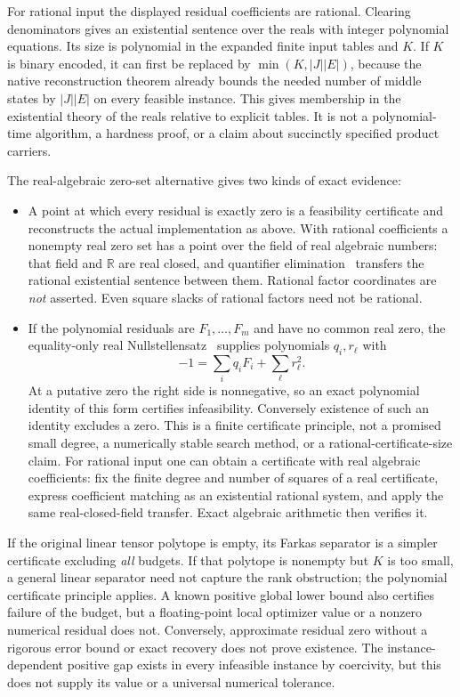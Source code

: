 \documentclass[11pt]{article}
\theoremstyle{remark}
\begin{document}
For rational input the displayed residual coefficients are rational.
Clearing denominators gives an existential sentence over the reals with
integer polynomial equations. Its size is polynomial in the expanded
finite input tables and $K$. If $K$ is binary encoded, it can first be
replaced by $\min(K,|J||E|)$, because the native reconstruction theorem
already bounds the needed number of middle states by $|J||E|$ on every
feasible instance. This gives membership in the existential theory of the
reals relative to explicit tables. It is not a polynomial-time algorithm,
a hardness proof, or a claim about succinctly specified product carriers.

The real-algebraic zero-set alternative gives two kinds of exact evidence:
\begin{itemize}
\item A point at which every residual is exactly zero is a feasibility
certificate and reconstructs the actual implementation as above. With
rational coefficients a nonempty real zero set has a point over the field
of real algebraic numbers: that field and $\mathbb R$ are real closed, and
quantifier elimination~\cite[Section 1.1 and Theorem 2.1]{Basu2014} transfers the rational existential sentence between
them. Rational factor coordinates are \emph{not} asserted. Even square
slacks of rational factors need not be rational.
\item If the polynomial residuals are $F_1,\ldots,F_m$ and have no common
real zero, the equality-only real Nullstellensatz~\cite[Theorem 4.6]{Parrilo2003} supplies polynomials $q_i,r_\ell$ with
\begin{equation}\label{eq:budget-nullstellensatz}
 -1=\sum_iq_iF_i+\sum_\ell r_\ell^2.
\end{equation}
At a putative zero the right side is nonnegative, so an exact polynomial
identity of this form certifies infeasibility. Conversely existence of
such an identity excludes a zero. This is a finite certificate principle,
not a promised small degree, a numerically stable search method, or a
rational-certificate-size claim. For rational input one can obtain a
certificate with real algebraic coefficients: fix the finite degree and
number of squares of a real certificate, express coefficient matching as
an existential rational system, and apply the same real-closed-field
transfer. Exact algebraic arithmetic then verifies it.
\end{itemize}
If the original linear tensor polytope is empty, its Farkas separator is a
simpler certificate excluding \emph{all} budgets. If that polytope is
nonempty but $K$ is too small, a general linear separator need not capture
the rank obstruction; the polynomial certificate principle applies.
A known positive global lower bound also certifies failure of the budget,
but a floating-point local optimizer value or a nonzero numerical residual
does not. Conversely, approximate residual zero without a rigorous error
bound or exact recovery does not prove existence. The instance-dependent
positive gap exists in every infeasible instance by coercivity, but this
does not supply its value or a universal numerical tolerance.
\end{document}
